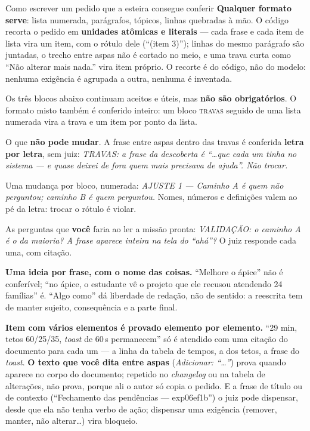 \documentclass[11pt,a4paper]{article}
\begin{document}
\begin{caixaPratica}{Como escrever um pedido que a esteira consegue conferir}
\textbf{Qualquer formato serve}: lista numerada, parágrafos, tópicos, linhas quebradas à mão. O código recorta o pedido em \textbf{unidades atômicas e literais} --- cada frase e cada item de lista vira um item, com o rótulo dele (``(item 3)''); linhas do mesmo parágrafo são juntadas, o trecho entre aspas não é cortado no meio, e uma trava curta como ``Não alterar mais nada.'' vira item próprio. O recorte é do código, não do modelo: nenhuma exigência é agrupada a outra, nenhuma é inventada.

\medskip
Os três blocos abaixo continuam aceitos e úteis, mas \textbf{não são obrigatórios}. O formato misto também é conferido inteiro: um bloco \textsc{travas} seguido de uma lista numerada vira a trava e um item por ponto da lista.

\begin{description}[leftmargin=2.6cm,style=sameline,font=\sffamily\bfseries\color{unNavy}]
  \item[TRAVAS:] O que \textbf{não pode mudar}. A frase entre aspas dentro das travas é conferida \textbf{letra por letra}, sem juiz: \emph{TRAVAS: a frase da descoberta é ``…que cada um tinha no sistema --- e quase deixei de fora quem mais precisava de ajuda''. Não trocar.}
  \item[AJUSTE 1 ---] Uma mudança por bloco, numerada: \emph{AJUSTE 1 --- Caminho A é quem não perguntou; caminho B é quem perguntou.} Nomes, números e definições valem ao pé da letra: trocar o rótulo é violar.
  \item[VALIDAÇÃO:] As perguntas que \textbf{você} faria ao ler a missão pronta: \emph{VALIDAÇÃO: o caminho A é o da maioria? A frase aparece inteira na tela do ``ahá''?} O juiz responde cada uma, com citação.
\end{description}

\textbf{Uma ideia por frase, com o nome das coisas.} ``Melhore o ápice'' não é conferível; ``no ápice, o estudante vê o projeto que ele recusou atendendo 24 famílias'' é. ``Algo como'' dá liberdade de redação, não de sentido: a reescrita tem de manter sujeito, consequência e a parte final.

\medskip
\textbf{Item com vários elementos é provado elemento por elemento.} ``29 min, tetos 60/25/35, \emph{toast} de 60\,s permanecem'' só é atendido com uma citação do documento para cada um --- a linha da tabela de tempos, a dos tetos, a frase do \emph{toast}. \textbf{O texto que você dita entre aspas} (\emph{Adicionar: ``\ldots''}) prova quando aparece no corpo do documento; repetido no \emph{changelog} ou na tabela de alterações, não prova, porque ali o autor só copia o pedido. E a frase de título ou de contexto (``Fechamento das pendências --- exp06ef1b'') o juiz pode dispensar, desde que ela não tenha verbo de ação; dispensar uma exigência (remover, manter, não alterar\ldots) vira bloqueio.
\end{caixaPratica}
\end{document}
